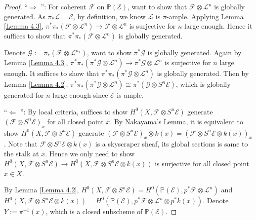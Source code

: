 \documentclass{ctexart}
\newcommand{\leftquotes}{\textquotedblleft}
\newcommand{\rightquotes}{\textquotedblright}
\begin{document}
\begin{proof}
    \leftquotes $\Rightarrow$ \rightquotes : For coherent $\mathcal{F}$ on $\mathbb{P}(\mathcal{E})$,
    want to show that $\mathcal{F} \otimes \mathcal{L}^{n}$ is globally generated.
    As $\pi_{\ast}\mathcal{L} = \mathcal{E}$, by definition, we know $\mathcal{L}$ is $\pi$-ample.
    Applying Lemma \ref{Lemma 4.3}, $\pi^{\ast}\pi_{\ast}(\mathcal{F} \otimes \mathcal{L}^{n}) \rightarrow \mathcal{F} \otimes \mathcal{L}^{n}$ is surjective for $n$ large enough.
    Hence it suffices to show that $\pi^{\ast}\pi_{\ast}(\mathcal{F} \otimes \mathcal{L}^{n})$ is globally generated.
    \par
    Denote $\mathcal{G} := \pi_{\ast}(\mathcal{F} \otimes \mathcal{L}^{n_{1}})$, want to show $\pi^{\ast}\mathcal{G}$ is globally generated.
    Again by Lemma \ref{Lemma 4.3}, $\pi^{\ast}\pi_{\ast}(\pi^{\ast}\mathcal{G} \otimes \mathcal{L}^{n}) \rightarrow \pi^{\ast}\mathcal{G} \otimes \mathcal{L}^{n}$ is surjective for $n$ large enough.
    It suffices to show that $\pi^{\ast}\pi_{\ast}(\pi^{\ast}\mathcal{G} \otimes \mathcal{L}^{n})$ is globally generated.
    Then by Lemma \ref{Lemma 4.2}, $\pi^{\ast}\pi_{\ast}(\pi^{\ast}\mathcal{G} \otimes \mathcal{L}^{n}) \cong \pi^{\ast}(\mathcal{G} \otimes S^{n}\mathcal{E})$,
    which is globally generated for $n$ large enough since $\mathcal{E}$ is ample.
    \par
    \leftquotes $\Leftarrow$ \rightquotes : By local criteria, suffices to show $H^{0}(X, \mathcal{F} \otimes S^{n}\mathcal{E})$ generate $(\mathcal{F} \otimes S^{n}\mathcal{E})_{x}$ for all closed point $x$.
    By Nakayama's Lemma, it is equivalent to show $H^{0}(X, \mathcal{F} \otimes S^{n}\mathcal{E})$ generate $(\mathcal{F} \otimes S^{n}\mathcal{E})_{x} \otimes k(x) = (\mathcal{F} \otimes S^{n}\mathcal{E} \otimes k(x))_{x}$.
    Note that $\mathcal{F} \otimes S^{n}\mathcal{E} \otimes k(x)$ is a skyscraper sheaf, its global sections is same to the stalk at $x$.
    Hence we only need to show $H^{0}(X, \mathcal{F} \otimes S^{n}\mathcal{E}) \rightarrow H^{0}(X, \mathcal{F} \otimes S^{n}\mathcal{E} \otimes k(x))$ is surjective for all closed point $x\in X$.
    \par
    By Lemma \ref{Lemma 4.2}, $H^{0}(X, \mathcal{F} \otimes S^{n}\mathcal{E}) = H^{0}(\mathbb{P}(\mathcal{E}), p^{\ast}\mathcal{F} \otimes \mathcal{L}^{n})$ and $H^{0}(X, \mathcal{F} \otimes S^{n}\mathcal{E} \otimes k(x)) = H^{0}(\mathbb{P}(\mathcal{E}), p^{\ast}\mathcal{F} \otimes \mathcal{L}^{n} \otimes p^{\ast}k(x))$.
    Denote $Y := \pi^{-1}(x)$, which is a closed subscheme of $\mathbb{P}(\mathcal{E})$.

\end{proof}
\end{document}
